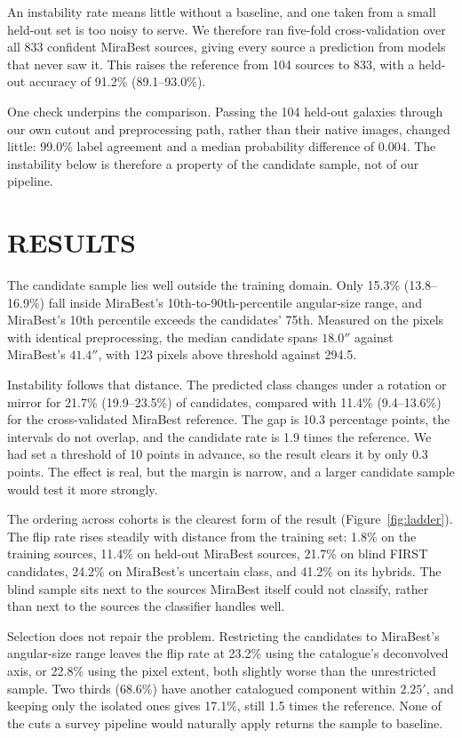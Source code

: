 \documentclass{aastex701}
\begin{document}
An instability rate means little without a baseline, and one taken from a small held-out set
is too noisy to serve. We therefore ran five-fold cross-validation over all 833 confident
MiraBest sources, giving every source a prediction from models that never saw it. This
raises the reference from 104 sources to 833, with a held-out accuracy of 91.2\%
(89.1--93.0\%).

One check underpins the comparison. Passing the 104 held-out galaxies through our own cutout
and preprocessing path, rather than their native images, changed little: 99.0\% label
agreement and a median probability difference of 0.004. The instability below is therefore a
property of the candidate sample, not of our pipeline.

\section{RESULTS}

The candidate sample lies well outside the training domain. Only 15.3\% (13.8--16.9\%) fall
inside MiraBest's 10th-to-90th-percentile angular-size range, and MiraBest's 10th percentile
exceeds the candidates' 75th. Measured on the pixels with identical preprocessing, the
median candidate spans $18.0''$ against MiraBest's $41.4''$, with 123 pixels above threshold
against 294.5.

Instability follows that distance. The predicted class changes under a rotation or mirror
for 21.7\% (19.9--23.5\%) of candidates, compared with 11.4\% (9.4--13.6\%) for the
cross-validated MiraBest reference. The gap is 10.3 percentage points, the intervals do not
overlap, and the candidate rate is 1.9 times the reference. We had set a threshold of 10
points in advance, so the result clears it by only 0.3 points. The effect is real, but the
margin is narrow, and a larger candidate sample would test it more strongly.

The ordering across cohorts is the clearest form of the result (Figure~\ref{fig:ladder}).
The flip rate rises steadily with distance from the training set: 1.8\% on the training
sources, 11.4\% on held-out MiraBest sources, 21.7\% on blind FIRST candidates, 24.2\% on
MiraBest's uncertain class, and 41.2\% on its hybrids. The blind sample sits next to the
sources MiraBest itself could not classify, rather than next to the sources the classifier
handles well.

Selection does not repair the problem. Restricting the candidates to MiraBest's angular-size
range leaves the flip rate at 23.2\% using the catalogue's deconvolved axis, or 22.8\% using
the pixel extent, both slightly worse than the unrestricted sample. Two thirds (68.6\%) have
another catalogued component within $2.25'$, and keeping only the isolated ones gives
17.1\%, still 1.5 times the reference. None of the cuts a survey pipeline would naturally
apply returns the sample to baseline.
\end{document}

